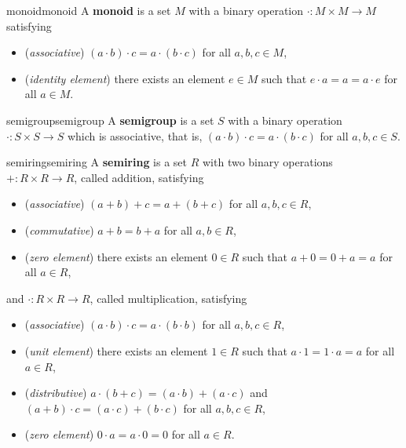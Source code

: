 \begin{topic}{monoid}{monoid}
    A \textbf{monoid} is a set $M$ with a binary operation $\cdot : M \times M \to M$ satisfying
    \begin{itemize}
        \item (\textit{associative}) $(a \cdot b) \cdot c = a \cdot (b \cdot c)$ for all $a, b, c \in M$,
        \item (\textit{identity element}) there exists an element $e \in M$ such that $e \cdot a = a = a \cdot e$ for all $a \in M$.
    \end{itemize}
\end{topic}

\begin{topic}{semigroup}{semigroup}
    A \textbf{semigroup} is a set $S$ with a binary operation $\cdot : S \times S \to S$ which is associative, that is, $(a \cdot b) \cdot c = a \cdot (b \cdot c)$ for all $a, b, c \in S$.
\end{topic}

\begin{topic}{semiring}{semiring}
    A \textbf{semiring} is a set $R$ with two binary operations $+ : R \times R \to R$, called addition, satisfying
    \begin{itemize}
        \item (\textit{associative}) $(a + b) + c = a + (b + c)$ for all $a, b, c \in R$,
        \item (\textit{commutative}) $a + b = b + a$ for all $a, b \in R$,
        \item (\textit{zero element}) there exists an element $0 \in R$ such that $a + 0 = 0 + a = a$ for all $a \in R$,
    \end{itemize}
    and $\cdot : R \times R \to R$, called multiplication, satisfying
    \begin{itemize}
        \item (\textit{associative}) $(a \cdot b) \cdot c = a \cdot (b \cdot b)$ for all $a, b, c \in R$,
        \item (\textit{unit element}) there exists an element $1 \in R$ such that $a \cdot 1 = 1 \cdot a = a$ for all $a \in R$,
        \item (\textit{distributive}) $a \cdot (b + c) = (a \cdot b) + (a \cdot c)$ and $(a + b) \cdot c = (a \cdot c) + (b \cdot c)$ for all $a, b, c \in R$,
        \item (\textit{zero element}) $0 \cdot a = a \cdot 0 = 0$ for all $a \in R$.
    \end{itemize}
\end{topic}

